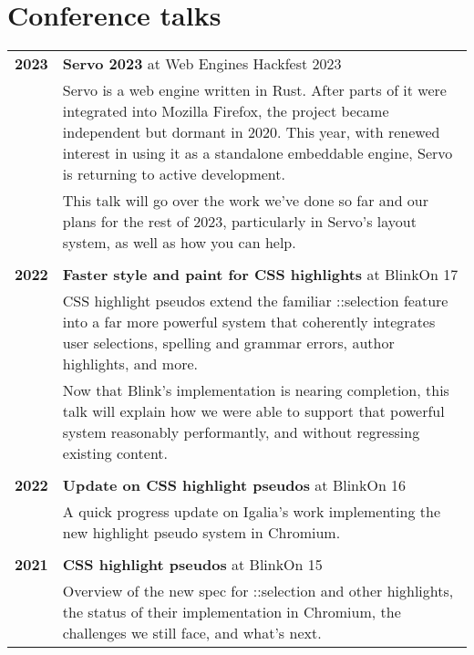 \documentclass[a4paper,12pt]{article}
\begin{document}
\section*{Conference talks}

\begin{tabular}{p{35mm}p{125mm}}
	                \\  \textbf{2023}			    & \textbf{Servo 2023} at Web Engines Hackfest 2023
	\vspace{0.2em}  \\                              & Servo is a web engine written in Rust. After parts of it were integrated into Mozilla Firefox, the project became independent but dormant in 2020. This year, with renewed interest in using it as a standalone embeddable engine, Servo is returning to active development.
	\vspace{0.2em}  \\                              & This talk will go over the work we’ve done so far and our plans for the rest of 2023, particularly in Servo’s layout system, as well as how you can help.
	\\              \\  \textbf{2022}			    & \textbf{Faster style and paint for CSS highlights} at BlinkOn 17
	\vspace{0.2em}  \\                              & CSS highlight pseudos extend the familiar ::selection feature into a far more powerful system that coherently integrates user selections, spelling and grammar errors, author highlights, and more.
	\vspace{0.2em}  \\                              & Now that Blink’s implementation is nearing completion, this talk will explain how we were able to support that powerful system reasonably performantly, and without regressing existing content.
	\\              \\  \textbf{2022}			    & \textbf{Update on CSS highlight pseudos} at BlinkOn 16
	\vspace{0.2em}  \\                              & A quick progress update on Igalia’s work implementing the new highlight pseudo system in Chromium.
	\\              \\  \textbf{2021}			    & \textbf{CSS highlight pseudos} at BlinkOn 15
	\vspace{0.2em}  \\                              & Overview of the new spec for ::selection and other highlights, the status of their implementation in Chromium, the challenges we still face, and what’s next.
\end{tabular}
\end{document}
